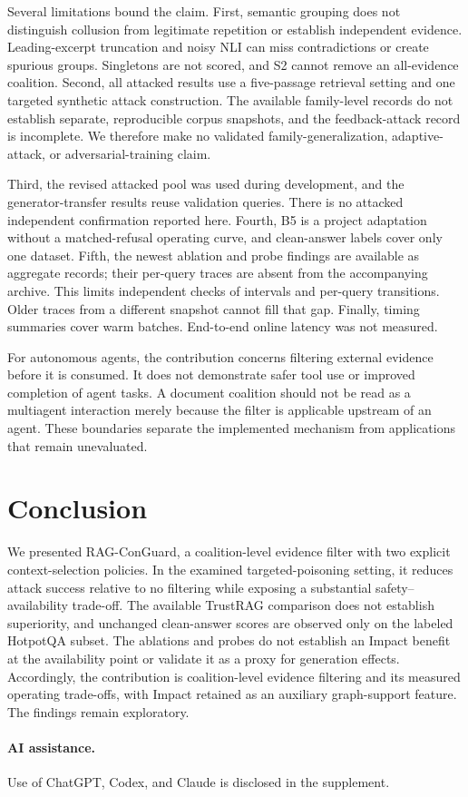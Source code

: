 \documentclass[sigconf]{aamas}
\begin{document}
Several limitations bound the claim. First, semantic grouping does not distinguish collusion from legitimate repetition or establish independent evidence. Leading-excerpt truncation and noisy NLI can miss contradictions or create spurious groups. Singletons are not scored, and S2 cannot remove an all-evidence coalition. Second, all attacked results use a five-passage retrieval setting and one targeted synthetic attack construction. The available family-level records do not establish separate, reproducible corpus snapshots, and the feedback-attack record is incomplete. We therefore make no validated family-generalization, adaptive-attack, or adversarial-training claim.

Third, the revised attacked pool was used during development, and the generator-transfer results reuse validation queries. There is no attacked independent confirmation reported here. Fourth, B5 is a project adaptation without a matched-refusal operating curve, and clean-answer labels cover only one dataset. Fifth, the newest ablation and probe findings are available as aggregate records; their per-query traces are absent from the accompanying archive. This limits independent checks of intervals and per-query transitions. Older traces from a different snapshot cannot fill that gap. Finally, timing summaries cover warm batches. End-to-end online latency was not measured.

For autonomous agents, the contribution concerns filtering external evidence before it is consumed. It does not demonstrate safer tool use or improved completion of agent tasks. A document coalition should not be read as a multiagent interaction merely because the filter is applicable upstream of an agent. These boundaries separate the implemented mechanism from applications that remain unevaluated.

\section{Conclusion}
We presented RAG-ConGuard, a coalition-level evidence filter with two explicit context-selection policies. In the examined targeted-poisoning setting, it reduces attack success relative to no filtering while exposing a substantial safety--availability trade-off. The available TrustRAG comparison does not establish superiority, and unchanged clean-answer scores are observed only on the labeled HotpotQA subset. The ablations and probes do not establish an Impact benefit at the availability point or validate it as a proxy for generation effects. Accordingly, the contribution is coalition-level evidence filtering and its measured operating trade-offs, with Impact retained as an auxiliary graph-support feature. The findings remain exploratory.

\paragraph{AI assistance.}
Use of ChatGPT, Codex, and Claude is disclosed in the supplement.

\clearpage
\balance


\end{document}
